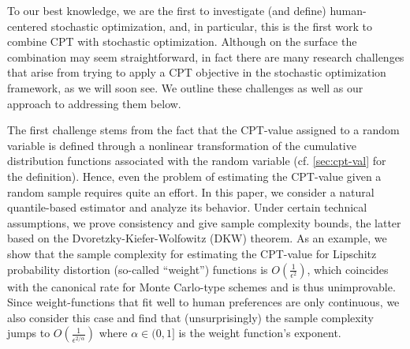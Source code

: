 To our best knowledge, we are the first to investigate (and define) human-centered stochastic optimization, and, in particular, 
this is the first work to combine CPT with stochastic optimization. Although on the surface the combination may seem straightforward, in fact there are many research challenges that arise from trying to apply a CPT objective in the stochastic optimization framework, as we will soon see. 
We outline these challenges as well as our approach to addressing them below. 

The first challenge stems from the fact that the CPT-value assigned to a random variable is defined through a nonlinear transformation of the cumulative distribution functions associated with the random variable (cf. \cref{sec:cpt-val} for the definition). 
Hence, even the problem of estimating the CPT-value given a random sample requires quite an effort.
In this paper, we consider a natural quantile-based estimator and analyze its behavior.
Under certain technical assumptions, we prove consistency and give sample complexity bounds, the latter based on the
 Dvoretzky-Kiefer-Wolfowitz (DKW) theorem.
As an example, we show that the sample complexity for estimating the CPT-value 
for Lipschitz probability distortion (so-called ``weight'') functions is  $O\left(\frac1{\epsilon^2}\right)$, which coincides with the canonical rate for Monte Carlo-type schemes and is thus unimprovable. Since weight-functions that fit well to human preferences are only  \holder continuous, we also consider this case and find that (unsurprisingly) the sample complexity  jumps to $O\left(\frac1{\epsilon^{2/\alpha}}\right)$ where $\alpha\in (0,1]$ is the weight function's \holder exponent.

